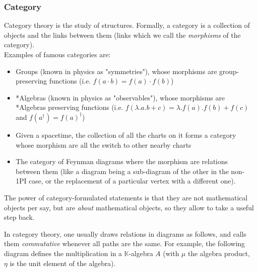 \documentclass[a4paper,11pt]{article}
\numberwithin{equation}{section}
\theoremstyle{definition}
\begin{document}
        \subsubsection{Category}
    Category theory is the study of structures. Formally, a category is a collection of objects and the links between them (links which we call the \emph{morphisms} of the category).\\
    Examples of famous categories are:
    \begin{itemize}
        \item Groups (known in physics as "symmetries"), whose morphisms are group-preserving functions (i.e. $f(a\cdot b)=f(a) \cdot f(b)$)
        \item *Algebras (known in physics as "observables"), whose morphisms are *Algebras preserving functions (i.e. $f(\lambda.a.b+c)=\lambda.f(a).f(b)+f(c)$ and $f(a^\dag)=f(a)^\dag$)
        \item Given a spacetime, the collection of all the charts on it forms a category whose morphism are all the switch to other nearby charts
        \item The category of Feynman diagrams where the morphism are relations between them (like a diagram being a sub-diagram of the other in the non-1PI case, or the replacement of a particular vertex with a different one).
    \end{itemize}
    The power of category-formulated statements is that they are not mathematical objects per say, but are \emph{about} mathematical objects, so they allow to take a useful step back.
    
    In category theory, one usually draws relations in diagrams as follows, and calls them \emph{commutative} whenever all paths are the same. For example, the following diagram defines the multiplication in a $\mathbb{K}$-algebra $A$ (with $\mu$ the algebra product, $\eta$ is the unit element of the algebra).\\
    
\end{document}
